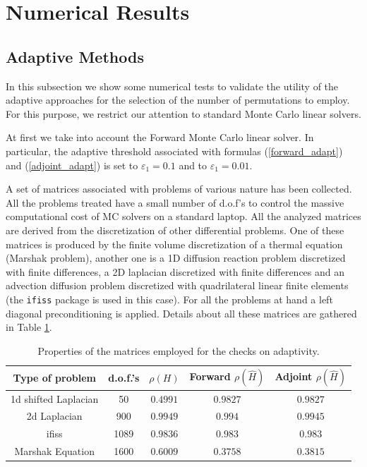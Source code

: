 \section{Numerical Results}
\label{sec:results}

\subsection{Adaptive Methods}

In this subsection we show some numerical tests to validate the utility of the
adaptive approaches for the selection of the number of permutations to employ.
For this purpose, we restrict our attention to standard Monte Carlo linear
solvers.

At first we take into account the Forward Monte Carlo linear solver.
In particular, the adaptive threshold associated with formulas
(\ref{forward_adapt}) and
(\ref{adjoint_adapt}) is set to $\varepsilon_1=0.1$ and to
$\varepsilon_1=0.01$. \newline

A set of matrices associated with problems of various nature has been collected.
All the problems treated have a small number of d.o.f's to control the
massive computational cost of MC solvers on a standard laptop. All the analyzed
matrices are derived from the
discretization of other differential problems.
One of these matrices is produced by the finite volume discretization of
a thermal equation (Marshak problem), another one is a 1D diffusion reaction
problem discretized with finite differences, a
2D laplacian discretized with finite differences and an advection
diffusion
problem discretized with quadrilateral linear finite elements (the
\texttt{ifiss} package is used in this case).
For all the problems at hand a left diagonal preconditioning is applied.
Details about all these matrices are gathered in Table
\ref{table_data}.

\begin{table}[!h]
\centering
\begin{tabular}{|c|c|c|c|c|}
\hline
\textbf{Type of problem} & \textbf{d.o.f.'s} &
$\rho(H)$&Forward $\rho(\hat{H})$&Adjoint $\rho(\hat{H})$\\
\hline
1d shifted Laplacian & 50 & $0.4991$ & $0.9827$ & $0.9827$\\
\hline
2d Laplacian & 900 & $0.9949$ & $0.994$ & $0.9945$\\
\hline
ifiss & 1089 &$0.9836$ & $0.983$ & $0.983$ \\
\hline
Marshak Equation & 1600 & $0.6009$ & $0.3758$ & $ 0.3815$ \\
\hline
\end{tabular}
\caption{Properties of the matrices employed for the checks on adaptivity.}
\label{table_data}
\end{table}

